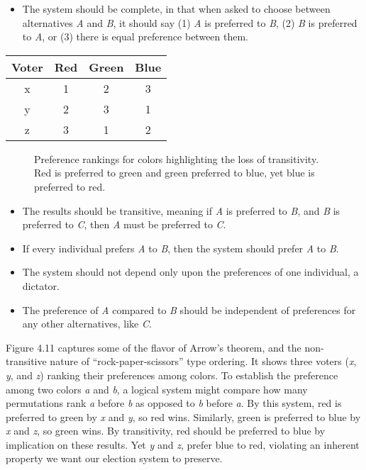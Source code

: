 \documentclass[10pt]{article}
\begin{document}
\begin{itemize}
    \item The system should be complete, in that when asked to choose between alternatives \textit{A} and \textit{B}, it should say (1) \textit{A} is preferred to \textit{B}, (2) \textit{B} is preferred to \textit{A}, or (3) there is equal preference between them.
\end{itemize}

\begin{center}
    \begin{tabular}{c|ccc}
        Voter & Red & Green & Blue \\
        \hline
        x & 1 & 2 & 3 \\
        y & 2 & 3 & 1 \\
        z & 3 & 1 & 2 \\
        \hline
    \end{tabular}
\end{center}

\begin{figure}
    \centering
    \caption{Preference rankings for colors highlighting the loss of transitivity. Red is preferred to green and green preferred to blue, yet blue is preferred to red.}
\end{figure}

\begin{itemize}
    \item The results should be transitive, meaning if \textit{A} is preferred to \textit{B}, and \textit{B} is preferred to \textit{C}, then \textit{A} must be preferred to \textit{C}.
    \item If every individual prefers \textit{A} to \textit{B}, then the system should prefer \textit{A} to \textit{B}.
    \item The system should not depend only upon the preferences of one individual, a dictator.
    \item The preference of \textit{A} compared to \textit{B} should be independent of preferences for any other alternatives, like \textit{C}.
\end{itemize}

Figure 4.11 captures some of the flavor of Arrow’s theorem, and the non-transitive nature of “rock-paper-scissors” type ordering. It shows three voters (\textit{x}, \textit{y}, and \textit{z}) ranking their preferences among colors. To establish the preference among two colors \textit{a} and \textit{b}, a logical system might compare how many permutations rank \textit{a} before \textit{b} as opposed to \textit{b} before \textit{a}. By this system, red is preferred to green by \textit{x} and \textit{y}, so red wins. Similarly, green is preferred to blue by \textit{x} and \textit{z}, so green wins. By transitivity, red should be preferred to blue by implication on these results. Yet \textit{y} and \textit{z}, prefer blue to red, violating an inherent property we want our election system to preserve.
\end{document}
